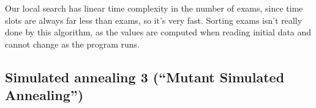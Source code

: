 \documentclass[11pt, a4paper, leqno]{article}
\begin{document}
	Our local search has linear time complexity in the number of exams, since time slots are always far less than exams, so it's very fast. Sorting exams isn't really done by this algorithm, as the values are computed when reading initial data and cannot change as the program runs.
	
	\subsection{Simulated annealing 3 (``Mutant Simulated Annealing\texttrademark'')}
	
	
	
	
\end{document}
